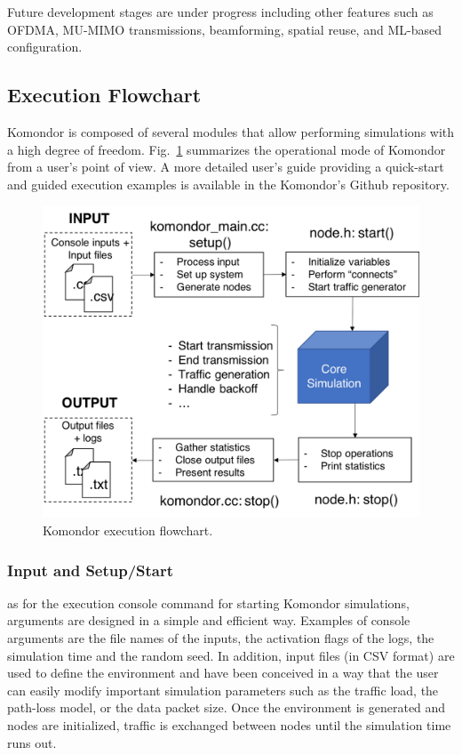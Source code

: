 \documentclass{article}
\begin{document}
	Future development stages are under progress including other features such as OFDMA, MU-MIMO transmissions, beamforming, spatial reuse, and ML-based configuration.
	
	\subsection{Execution Flowchart}
	\label{subsection:flowchart}
	Komondor is composed of several modules that allow performing simulations with a high degree of freedom. Fig.~\ref{fig:komondor_flowchart} summarizes the operational mode of Komondor from a user's point of view. A more detailed user's guide providing a quick-start and guided execution examples is available in the Komondor's Github repository.
	
	\begin{figure}[t]
		\centering
		\includegraphics[width=0.65\columnwidth]{komondor_flowchart_helvetica.png}
		\caption{Komondor execution flowchart.}
		\label{fig:komondor_flowchart}
	\end{figure}		
	
	\subsubsection{Input and Setup/Start}
	as for the execution console command for starting Komondor simulations, arguments are designed in a simple and efficient way. Examples of console arguments are the file names of the inputs, the activation flags of the logs, the simulation time and the random seed. In addition, input files (in CSV format) are used to define the environment and have been conceived in a way that the user can easily modify important simulation parameters such as the traffic load, the path-loss model, or the data packet size.
	Once the environment is generated and nodes are initialized, traffic is exchanged between nodes until the simulation time runs out.
	
\end{document}
